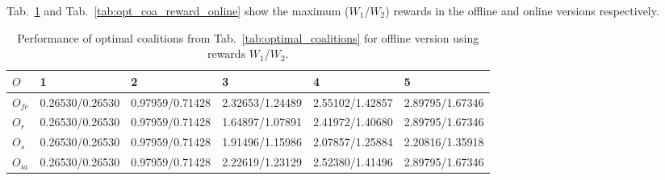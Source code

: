 \documentclass{llncs}
\begin{document}
\begin{table}
 \centering
{}

\caption{Values for maximum probabilities to complete both tasks for coalitions from Tab.~\ref{tab:optimal_coalitions}.} \label{tab:optimal_2task}
\end{table}



Tab.~\ref{tab:opt_coa_reward_offline} and Tab.~\ref{tab:opt_coa_reward_online} show the maximum ($W_1$/$W_2$) rewards in the offline and online versions respectively.


\begin{table}
 \centering
 \begin{tabular}{ | l | l | l | l | l | l |}
    \hline
    $O$ & 1& 2 & 3 & 4 & 5 \\ \hline
    $O_{fc}$ & 0.26530/0.26530  & 0.97959/0.71428  &  2.32653/1.24489  &  2.55102/1.42857   &  2.89795/1.67346  \\ \hline
    $O_r$ &  0.26530/0.26530   & 0.97959/0.71428  &  1.64897/1.07891  &  2.41972/1.40680   &  2.89795/1.67346 \\ \hline
    $O_s$ &  0.26530/0.26530   &  0.97959/0.71428  & 1.91496/1.15986  &  2.07857/1.25884   &  2.20816/1.35918  \\ \hline
    $O_{ia}$ & 0.26530/0.26530   &  0.97959/0.71428  &  2.22619/1.23129  &  2.52380/1.41496   &  2.89795/1.67346  \\ \hline
\end{tabular}
\caption{Performance of optimal coalitions from Tab.~\ref{tab:optimal_coalitions} for offline version using rewards $W_1$/$W_2$.}
\label{tab:opt_coa_reward_offline}
\end{table}
\end{document}
